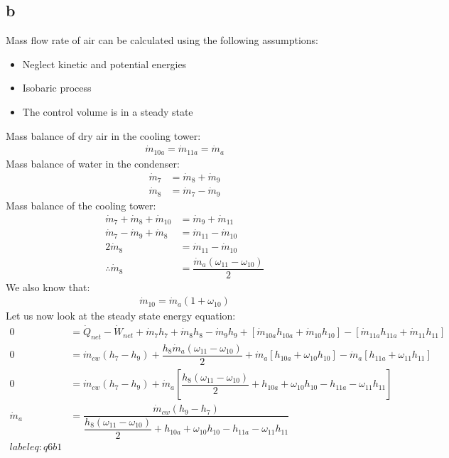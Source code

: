 \documentclass[11pt]{article}
\numberwithin{equation}{section}
\begin{document}
\subsection{b}
Mass flow rate of air can be calculated using the following assumptions:
\begin{itemize}
    \item Neglect kinetic and potential energies
    \item Isobaric process
    \item The control volume is in a steady state
\end{itemize}
Mass balance of dry air in the cooling tower:
\begin{align}
    \dot{m}_{10a} = \dot{m}_{11a} = \dot{m}_{a}
\end{align}
Mass balance of water in the condenser:
\begin{align}
    \dot{m}_7 &= \dot{m}_8 + \dot{m}_9\\
    \dot{m}_8 &= \dot{m}_7 - \dot{m}_9
\end{align}
Mass balance of the cooling tower:
\begin{align}
    \dot{m}_7 + \dot{m}_8 + \dot{m}_{10} &= \dot{m}_9 + \dot{m}_{11}\\
    \dot{m}_7 - \dot{m}_9 + \dot{m}_8 &= \dot{m}_11 - \dot{m}_{10}\\
    2\dot{m}_8 &= \dot{m}_{11} - \dot{m}_{10}\\
    \therefore \dot{m}_8 &= \dfrac{\dot{m}_a\left(\omega_{11} - \omega_{10}\right)}{2}
\end{align}
We also know that:
\begin{align}
    \dot{m}_{10} = \dot{m}_a \left(1 + \omega_{10}\right) \label{eq:q6b2}
\end{align}
Let us now look at the steady state energy equation:
\begin{align}
    0 &= \dot{Q}_{net} - \dot{W}_{net} + \dot{m}_7 h_7 + \dot{m}_8 h_8 -\dot{m}_9 h_9 + \left[\dot{m}_{10a} h_{10a} + \dot{m}_{10} h_{10}\right] - \left[\dot{m}_{11a} h_{11a} + \dot{m}_{11} h_{11}\right]\\
    0 &= \dot{m}_{cw} \left(h_7 - h_9\right) + \dfrac{h_8 \dot{m}_a\left(\omega_{11} - \omega_{10}\right)}{2} + \dot{m}_a \left[h_{10a} + \omega_{10}h_{10}\right] - \dot{m}_a \left[h_{11a} + \omega_{11}h_{11}\right]\\
    0 &=\dot{m}_{cw} \left(h_7 - h_9\right) + \dot{m}_a \left[\dfrac{h_8 \left(\omega_{11}- \omega_{10}\right)}{2} + h_{10a} + \omega_{10}h_{10}- h_{11a} - \omega_{11}h_{11} \right]\\
    \dot{m}_a &= \dfrac{\dot{m}_{cw} \left(h_9 - h_7\right)}{\dfrac{h_8 \left(\omega_{11}- \omega_{10}\right)}{2} + h_{10a} + \omega_{10}h_{10}- h_{11a} - \omega_{11}h_{11}} \\label{eq:q6b1}
\end{align}
\end{document}
